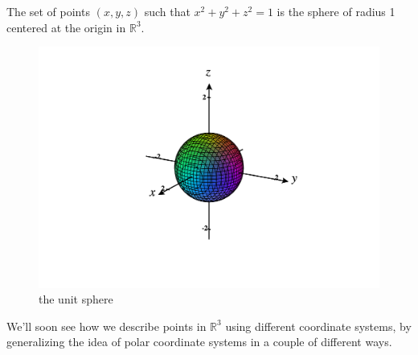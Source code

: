 \documentclass{ximera}
\begin{document}
\begin{example}
The set of points $(x,y,z)$ such that $x^2+y^2+z^2 = 1$ is the sphere of radius 1 centered at the origin in $\mathbb{R}^3$.

\begin{figure}[h!]
\caption{the unit sphere}
\includegraphics[width=\textwidth]{CalcPlot3D-unit_sphere}
\end{figure}

\end{example}

We'll soon see how we describe points in $\mathbb{R}^3$ using different coordinate systems, by generalizing the idea of polar coordinate systems in a couple of different ways.
\end{document}

